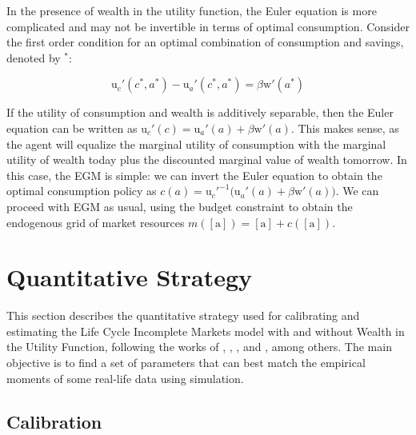 \documentclass{article}
\newcommand{\DiscFac}{\beta}
\newcommand{\uFunc}{\mathrm{u}}
\newcommand{\aNrm}{a}
\newcommand{\cNrm}{c}
\newcommand{\mNrm}{m}
\newcommand{\wFunc}{\mathrm{w}}
\newcommand{\aMat}{[\mathrm{a}]}
\begin{document}
In the presence of wealth in the utility function, the Euler equation is more complicated and may not be invertible in terms of optimal consumption. Consider the first order condition for an optimal combination of consumption and savings, denoted by $^*$:

\begin{equation}
\uFunc_{c}'(\cNrm^*, \aNrm^*) - \uFunc_{a}'(\cNrm^*, \aNrm^*) = \DiscFac \wFunc'(\aNrm^*)
\end{equation}

If the utility of consumption and wealth is additively separable, then the Euler equation can be written as $\uFunc_{c}'(\cNrm) = \uFunc_{a}'(\aNrm) + \DiscFac \wFunc'(\aNrm)$. This makes sense, as the agent will equalize the marginal utility of consumption with the marginal utility of wealth today plus the discounted marginal value of wealth tomorrow. In this case, the EGM is simple: we can invert the Euler equation to obtain the optimal consumption policy as $\cNrm(\aNrm) = \uFunc_{c}'^{ -1}\big(\uFunc_{a}'(\aNrm) + \DiscFac \wFunc'(\aNrm)\big)$. We can proceed with EGM as usual, using the budget constraint to obtain the endogenous grid of market resources $\mNrm(\aMat) = \aMat + \cNrm(\aMat)$.

\section{Quantitative Strategy}\label{Quantitative Strategy}

This section describes the quantitative strategy used for calibrating and estimating the Life Cycle Incomplete Markets model with and without Wealth in the Utility Function, following the works of \cite{Cagetti_2003}, \cite{Palumbo_1999}, \cite{Gourinchas_2002}, and \cite{Sabelhaus_2010}, among others. The main objective is to find a set of parameters that can best match the empirical moments of some real-life data using simulation.

\subsection{Calibration}\label{Calibration}
\end{document}
